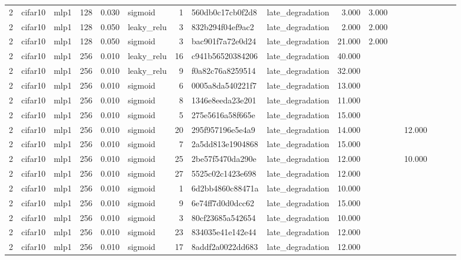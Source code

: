 \begin{table}[htbp]
{\begin{tabular}{@{}rllrrlrllrrrrrrr@{}}
2 & cifar10 & mlp1 & 128 & 0.030 & sigmoid & 1 & 560db0c17cb0f2d8 & late\_degradation & 3.000 & 3.000 &  &  &  &  &  \\
2 & cifar10 & mlp1 & 128 & 0.050 & leaky\_relu & 3 & 832b294f04ef9ac2 & late\_degradation & 2.000 & 2.000 &  &  &  &  &  \\
2 & cifar10 & mlp1 & 128 & 0.050 & sigmoid & 3 & bac901f7a72e0d24 & late\_degradation & 21.000 & 2.000 &  &  &  &  &  \\
2 & cifar10 & mlp1 & 256 & 0.010 & leaky\_relu & 16 & c941b56520384206 & late\_degradation & 40.000 &  &  &  &  &  &  \\
2 & cifar10 & mlp1 & 256 & 0.010 & leaky\_relu & 9 & f0a82c76a8259514 & late\_degradation & 32.000 &  &  &  &  &  &  \\
2 & cifar10 & mlp1 & 256 & 0.010 & sigmoid & 6 & 0005a8da540221f7 & late\_degradation & 13.000 &  &  &  &  &  &  \\
2 & cifar10 & mlp1 & 256 & 0.010 & sigmoid & 8 & 1346e8eeda23e201 & late\_degradation & 11.000 &  &  &  &  &  &  \\
2 & cifar10 & mlp1 & 256 & 0.010 & sigmoid & 5 & 275e5616a58f665e & late\_degradation & 15.000 &  &  &  &  &  &  \\
2 & cifar10 & mlp1 & 256 & 0.010 & sigmoid & 20 & 295f957196e5e4a9 & late\_degradation & 14.000 &  &  & 12.000 &  &  &  \\
2 & cifar10 & mlp1 & 256 & 0.010 & sigmoid & 7 & 2a5dd813e1904868 & late\_degradation & 15.000 &  &  &  &  &  &  \\
2 & cifar10 & mlp1 & 256 & 0.010 & sigmoid & 25 & 2be57f5470da290e & late\_degradation & 12.000 &  &  & 10.000 &  &  &  \\
2 & cifar10 & mlp1 & 256 & 0.010 & sigmoid & 27 & 5525c02c1423e698 & late\_degradation & 12.000 &  &  &  &  &  &  \\
2 & cifar10 & mlp1 & 256 & 0.010 & sigmoid & 1 & 6d2bb4860c88471a & late\_degradation & 10.000 &  &  &  &  &  &  \\
2 & cifar10 & mlp1 & 256 & 0.010 & sigmoid & 9 & 6e74ff7d0d0dcc62 & late\_degradation & 15.000 &  &  &  &  &  &  \\
2 & cifar10 & mlp1 & 256 & 0.010 & sigmoid & 3 & 80cf23685a542654 & late\_degradation & 10.000 &  &  &  &  &  &  \\
2 & cifar10 & mlp1 & 256 & 0.010 & sigmoid & 23 & 834035e41e142e44 & late\_degradation & 12.000 &  &  &  &  &  &  \\
2 & cifar10 & mlp1 & 256 & 0.010 & sigmoid & 17 & 8addf2a0022dd683 & late\_degradation & 12.000 &  &  &  &  &  &  \\

\end{tabular}}
\end{table}
